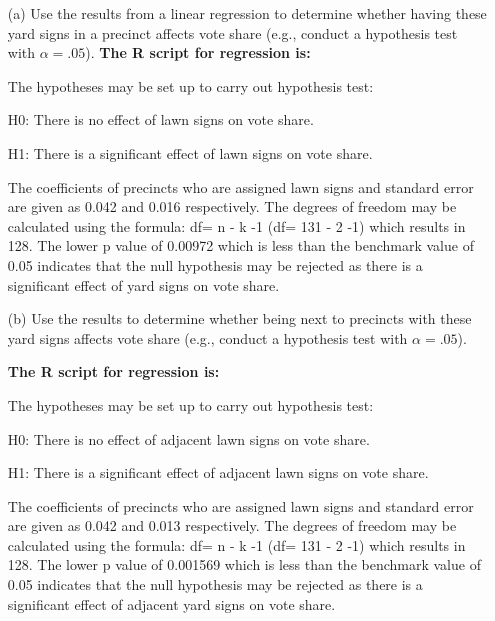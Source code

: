 \documentclass[12pt,letterpaper]{article}
\begin{document}
\vspace{.5cm}
\begin{enumerate}
	\item [(a)] Use the results from a linear regression to determine whether having these yard signs in a precinct affects vote share (e.g., conduct a hypothesis test with $\alpha = .05$).
	\textbf{		The R script for regression is:}		  
	\newpage
	\item[] The hypotheses may be set up to carry out hypothesis test:
	
	H0: There is no effect of lawn signs on vote share.
	
	H1: There is a significant effect of lawn signs on vote share.
	
	\item[]The coefficients of precincts who are assigned lawn signs and standard
	error are given as 0.042 and 0.016 respectively. The degrees of freedom
	may be calculated using the formula: df= n - k -1 (df= 131 - 2 -1)
	which results in 128. The lower p value of 0.00972 which is less than the benchmark value of 0.05 indicates that the null hypothesis may be rejected as there is a significant effect of yard signs on vote share. 
	
	
	\vspace{1cm}
	\item [(b)]  Use the results to determine whether being
	next to precincts with these yard signs affects vote
	share (e.g., conduct a hypothesis test with $\alpha = .05$).
	
	\textbf{		The R script for regression is:}		
	\item[] The hypotheses may be set up to carry out hypothesis test:
	
	H0: There is no effect of adjacent lawn signs on vote share.
	
	H1: There is a significant effect of adjacent lawn signs on vote share.
	
	The coefficients of precincts who are assigned lawn signs and standard
	error are given as 0.042 and 0.013 respectively. The degrees of freedom
	may be calculated using the formula: df= n - k -1 (df= 131 - 2 -1)
	which results in 128. The lower p value of 0.001569 which is less than the benchmark value of 0.05 indicates that the null hypothesis may be rejected as there is a significant effect of adjacent yard signs on vote share.
	

\end{enumerate}
\end{document}

